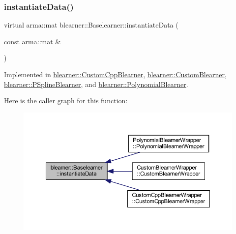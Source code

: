 \subsubsection{\texorpdfstring{instantiate\+Data()}{instantiateData()}}
{\footnotesize\ttfamily virtual arma\+::mat blearner\+::\+Baselearner\+::instantiate\+Data (\begin{DoxyParamCaption}\item[{const arma\+::mat \&}]{ }\end{DoxyParamCaption})\hspace{0.3cm}{\ttfamily [pure virtual]}}



Implemented in \mbox{\hyperlink{classblearner_1_1_custom_cpp_blearner_a14607a1d1f312d46a3024b37085c146d}{blearner\+::\+Custom\+Cpp\+Blearner}}, \mbox{\hyperlink{classblearner_1_1_custom_blearner_a18971368219f6948456b8e60c20b6968}{blearner\+::\+Custom\+Blearner}}, \mbox{\hyperlink{classblearner_1_1_p_spline_blearner_ac0604daac451678e67a6a2ac60dd1b01}{blearner\+::\+P\+Spline\+Blearner}}, and \mbox{\hyperlink{classblearner_1_1_polynomial_blearner_a5d3a44e8a4a8155ac24ee05e2c68af75}{blearner\+::\+Polynomial\+Blearner}}.

Here is the caller graph for this function\+:
\nopagebreak
\begin{figure}[H]
\begin{center}
\leavevmode
\includegraphics[width=350pt]{classblearner_1_1_baselearner_af01f1b8c4540927705ff79c3649489f7_icgraph}
\end{center}
\end{figure}
\mbox{\label{classblearner_1_1_baselearner_ab37986047db43c84420fef2cef7fc20d}} 
